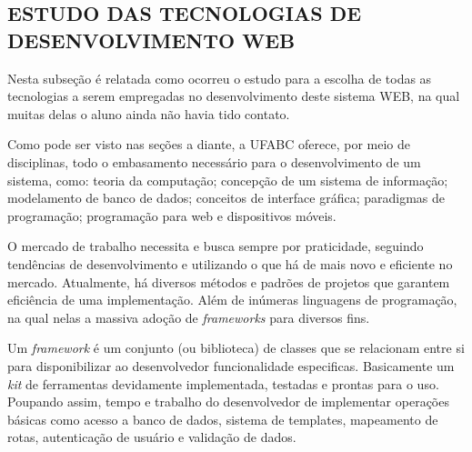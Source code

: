 \documentclass[
  12pt,				%
  openany,
  oneside,
  a4paper,			%
  english,			%
  brazil
]{article}
\numberwithin{figure}{section}
\numberwithin{table}{section}
\begin{document}




\subsection{ESTUDO DAS TECNOLOGIAS DE DESENVOLVIMENTO WEB}

Nesta subseção é relatada como ocorreu o estudo para a escolha de todas as tecnologias a serem empregadas no desenvolvimento deste sistema WEB, na qual muitas delas o aluno ainda não havia tido contato.

Como pode ser visto nas seções a diante, a UFABC oferece, por meio de disciplinas, todo o embasamento necessário para o desenvolvimento de um sistema, como: teoria da computação; concepção de um sistema de informação; modelamento de banco de dados; conceitos de interface gráfica; paradigmas de programação; programação para web e dispositivos móveis.

O mercado de trabalho necessita e busca sempre por praticidade, seguindo tendências de desenvolvimento e utilizando o que há de mais novo e eficiente no mercado. Atualmente, há diversos métodos e padrões de projetos que garantem eficiência de uma implementação. Além de inúmeras linguagens de programação, na qual nelas a massiva adoção de \textit{frameworks} para diversos fins.

Um \textit{framework} é um conjunto (ou biblioteca) de classes que se relacionam entre si para disponibilizar ao desenvolvedor funcionalidade especificas. Basicamente um \textit{kit} de ferramentas devidamente implementada, testadas e prontas para o uso. Poupando assim, tempo e trabalho do desenvolvedor de implementar operações básicas como acesso a banco de dados, sistema de templates, mapeamento de rotas, autenticação de usuário e validação de dados.
\end{document}
